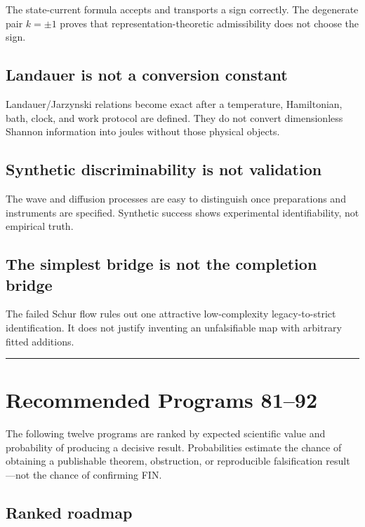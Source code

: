 \documentclass[11pt,a4paper,openany]{report}
\begin{document}
The state-current formula accepts and transports a sign correctly. The degenerate pair \(k=\pm1\) proves that representation-theoretic admissibility does not choose the sign.

\section{Landauer is not a conversion constant}

Landauer/\allowbreak{}Jarzynski relations become exact after a temperature, Hamiltonian, bath, clock, and work protocol are defined. They do not convert dimensionless Shannon information into joules without those physical objects.

\section{Synthetic discriminability is not validation}

The wave and diffusion processes are easy to distinguish once preparations and instruments are specified. Synthetic success shows experimental identifiability, not empirical truth.

\section{The simplest bridge is not the completion bridge}

The failed Schur flow rules out one attractive low-complexity legacy-to-strict identification. It does not justify inventing an unfalsifiable map with arbitrary fitted additions.

\par\medskip\hrule\medskip

\chapter{Recommended Programs 81--92}

The following twelve programs are ranked by expected scientific value and probability of producing a decisive result. Probabilities estimate the chance of obtaining a publishable theorem, obstruction, or reproducible falsification result---not the chance of confirming FIN.

\section{Ranked roadmap}
\end{document}
